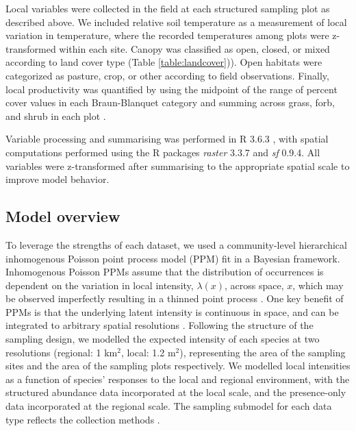 \documentclass[preprint,review,times,12pt,3p]{elsarticle}
\begin{document}
Local variables were collected in the field at each structured sampling plot as described above. We included relative soil temperature as a measurement of local variation in temperature, where the recorded temperatures among plots were z-transformed within each site. Canopy was classified as open, closed, or mixed according to land cover type (Table \ref{table:landcover})). Open habitats were categorized as pasture, crop, or other according to field observations. Finally, local productivity was quantified by using the midpoint of the range of percent cover values in each Braun-Blanquet category and summing across grass, forb, and shrub in each plot \citep{Douglas1978,Mccain2018,Szewczyk2018}.

Variable processing and summarising was performed in R 3.6.3 \citep{R-3-6-3}, with spatial computations performed using the R packages \emph{raster} 3.3.7 and \emph{sf} 0.9.4. All variables were z-transformed after summarising to the appropriate spatial scale to improve model behavior.


\subsection{Model overview}
To leverage the strengths of each dataset, we used a community-level hierarchical inhomogenous Poisson point process model (PPM) fit in a Bayesian framework. Inhomogenous Poisson PPMs assume that the distribution of occurrences is dependent on the variation in local intensity, $\lambda(x)$, across space, $x$, which may be observed imperfectly resulting in a thinned point process \citep{Warton2010,Baddeley2015,Fithian2015}. One key benefit of PPMs is that the underlying latent intensity is continuous in space, and can be integrated to arbitrary spatial resolutions \citep{Renner2015,Hefley2016,Koshkina2017a,Fletcher2019}. Following the structure of the sampling design, we modelled the expected intensity of each species at two resolutions (regional: 1 km$^2$, local: 1.2 m$^2$), representing the area of the sampling sites and the area of the sampling plots respectively. We modelled local intensities as a function of species' responses to the local and regional environment, with the structured abundance data incorporated at the local scale, and the presence-only data incorporated at the regional scale. The sampling submodel for each data type reflects the collection methods \citep{Isaac2014,Hefley2016,Fletcher2019,Miller2019}.
\end{document}
